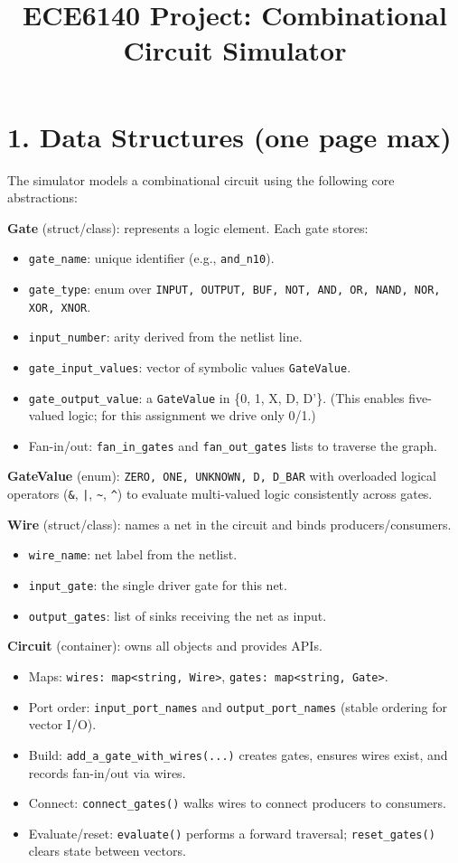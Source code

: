 \documentclass[11pt]{article}
\title{ECE6140 Project: Combinational Circuit Simulator}
\author{\vspace{-0.5em}}
\date{\vspace{-1.5em}}
\begin{document}
\maketitle

\section*{1. Data Structures (one page max)}
The simulator models a combinational circuit using the following core abstractions:

\textbf{Gate} (struct/class): represents a logic element. Each gate stores:
\begin{itemize}
  \item \texttt{gate\_name}: unique identifier (e.g., \texttt{and\_n10}).
  \item \texttt{gate\_type}: enum over \texttt{INPUT, OUTPUT, BUF, NOT, AND, OR, NAND, NOR, XOR, XNOR}.
  \item \texttt{input\_number}: arity derived from the netlist line.
  \item \texttt{gate\_input\_values}: vector of symbolic values \texttt{GateValue}.
  \item \texttt{gate\_output\_value}: a \texttt{GateValue} in \{0, 1, X, D, D'\}. (This enables five-valued logic; for this assignment we drive only 0/1.)
  \item Fan-in/out: \texttt{fan\_in\_gates} and \texttt{fan\_out\_gates} lists to traverse the graph.
\end{itemize}

\textbf{GateValue} (enum): \texttt{ZERO, ONE, UNKNOWN, D, D\_BAR} with overloaded logical operators (\texttt{\&}, \texttt{|}, \texttt{\textasciitilde}, \texttt{\^}) to evaluate multi-valued logic consistently across gates.

\textbf{Wire} (struct/class): names a net in the circuit and binds producers/consumers.
\begin{itemize}
  \item \texttt{wire\_name}: net label from the netlist.
  \item \texttt{input\_gate}: the single driver gate for this net.
  \item \texttt{output\_gates}: list of sinks receiving the net as input.
\end{itemize}

\textbf{Circuit} (container): owns all objects and provides APIs.
\begin{itemize}
  \item Maps: \texttt{wires: map<string, Wire>}, \texttt{gates: map<string, Gate>}.
  \item Port order: \texttt{input\_port\_names} and \texttt{output\_port\_names} (stable ordering for vector I/O).
  \item Build: \texttt{add\_a\_gate\_with\_wires(...)} creates gates, ensures wires exist, and records fan-in/out via wires.
  \item Connect: \texttt{connect\_gates()} walks wires to connect producers to consumers.
  \item Evaluate/reset: \texttt{evaluate()} performs a forward traversal; \texttt{reset\_gates()} clears state between vectors.
\end{itemize}
\end{document}
